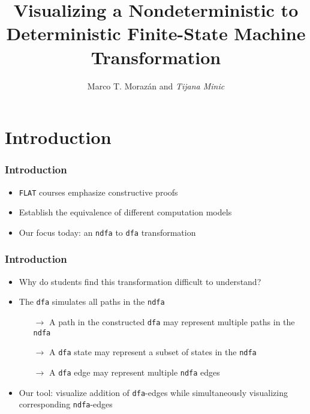 \documentclass{beamer}
\newcommand{\arrow}{\(\rightarrow\)}
\newcommand{\dfa}{\texttt{dfa}}
\newcommand{\ndfa}{\texttt{ndfa}}
\begin{document}
\title{Visualizing a Nondeterministic to Deterministic Finite-State Machine Transformation}
\author{Marco T. Moraz\'{a}n and \emph{Tijana Minic}}
\date{}

\begin{frame}
\titlepage
\end{frame}

\section{Introduction}

\begin{frame}[fragile]
\frametitle{Introduction}
\begin{scriptsize}
\begin{itemize}
\item<1-> \texttt{FLAT} courses emphasize constructive proofs

\item<1-> Establish the equivalence of different computation models

\item<1-> Our focus today: an \ndfa{} to \dfa{} transformation
\end{itemize}
\end{scriptsize}
\end{frame}

\begin{frame}[fragile]
\frametitle{Introduction}
\begin{scriptsize}
\begin{itemize}
\item<1-> Why do students find this transformation difficult to understand?

\item<2-> The \dfa{} simulates all paths in the \ndfa{}

\begin{itemize}
\scriptsize
\item[\arrow] A path in the constructed \dfa{} may represent multiple paths in the \ndfa{}

\item[\arrow]  A \dfa{} state may represent a subset of states in the \texttt{ndfa}

\item[\arrow] A \dfa{} edge may represent multiple \ndfa{} edges

\end{itemize}

\item<3-> Our tool: visualize addition of \texttt{dfa}-edges while simultaneously visualizing corresponding \texttt{ndfa}-edges


\end{itemize}
\end{scriptsize}
\end{frame}
\end{document}
